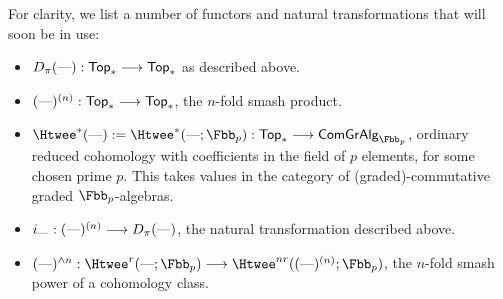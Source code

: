 For clarity, we list a number of functors and natural transformations that will soon be in use:
\begin{itemize}
\item $D_\pi(\DASH):\mathsf{Top}_*\to\mathsf{Top}_*$ as described above.
\item $(\textup{---})^{(n)}:\mathsf{Top}_*\to\mathsf{Top}_*$, the $n$-fold smash product.
\item $\Htwee^*(\DASH):=\Htwee^*(\textup{---};\Fbb_p):\mathsf{Top}_*\to\mathsf{ComGrAlg}_{\Fbb_p}$, ordinary reduced cohomology with coefficients in the field of $p$ elements, for some chosen prime $p$. This takes values in the category of (graded)-commutative graded $\Fbb_p$-algebras.
\item $i_\DASH:(\DASH)^{(n)}\to D_\pi(\DASH)$, the natural transformation described above.
\item $(\DASH)^{\sprod n}:\Htwee^r(\textup{---};\Fbb_p)\to\Htwee^{nr}((\DASH)^{(n)};\Fbb_p)$, the $n$-fold smash power of a cohomology class.
\end{itemize}



